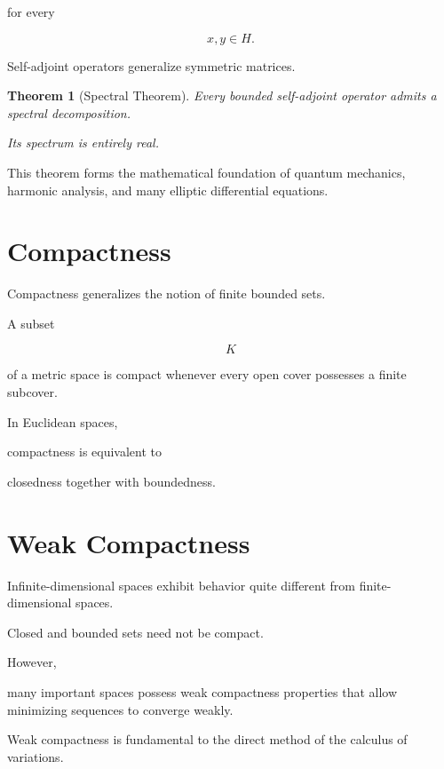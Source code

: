 \documentclass[11pt,fleqn]{book}
\numberwithin{equation}{chapter}
\theoremstyle{plain}
\newtheorem{theorem}{Theorem}[chapter]
\theoremstyle{definition}
\theoremstyle{remark}
\begin{document}
for every

\[
x,y\in H.
\]

Self-adjoint operators generalize symmetric matrices.


\begin{theorem}[Spectral Theorem]

Every bounded self-adjoint operator admits a spectral decomposition.

Its spectrum is entirely real.

\end{theorem}

This theorem forms the mathematical foundation of quantum mechanics,
harmonic analysis, and many elliptic differential equations.


\section{Compactness}

Compactness generalizes the notion of finite bounded sets.

A subset

\[
K
\]

of a metric space is compact whenever every open cover possesses a
finite subcover.

In Euclidean spaces,

compactness is equivalent to

closedness together with boundedness.


\section{Weak Compactness}

Infinite-dimensional spaces exhibit behavior quite different from
finite-dimensional spaces.

Closed and bounded sets need not be compact.

However,

many important spaces possess weak compactness properties that allow
minimizing sequences to converge weakly.

Weak compactness is fundamental to the direct method of the calculus of
variations.
\end{document}
